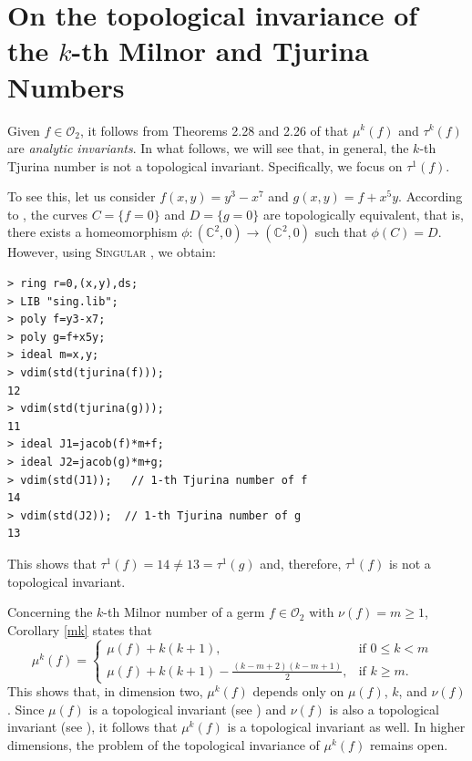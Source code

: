 \documentclass[12pt,letterpaper]{amsart}
\newcommand{\C}{\mathbb{C}}
\begin{document}
\section{On the topological invariance of the $k$-th Milnor and Tjurina Numbers}\label{topo}

Given $f\in\mathcal{O}_2$, it follows from Theorems 2.28 and 2.26 of \cite{Greuel} that $\mu^k(f)$ and $\tau^k(f)$ are \textit{analytic invariants}.  In what follows, we will see that, in general, the $k$-th Tjurina number is not a topological invariant. Specifically, we focus on $\tau^1(f)$.
\par To see this, let us consider $f(x,y)=y^3-x^7$ and $g(x,y)=f+x^5y$. According to \cite[p. 218]{Greuel}, the curves $C=\{f=0\}$ and $D=\{g=0\}$ are topologically equivalent, that is, there exists a homeomorphism $\phi:(\C^2,0)\to(\C^2,0)$ such that $\phi(C)=D$. However, using \textsc{Singular} \cite{Singular}, we obtain:
\begin{verbatim}
> ring r=0,(x,y),ds;      
> LIB "sing.lib";          
> poly f=y3-x7;               
> poly g=f+x5y;                 
> ideal m=x,y;                                     
> vdim(std(tjurina(f)));                         
12                                        
> vdim(std(tjurina(g)));                             
11                                            
> ideal J1=jacob(f)*m+f;               
> ideal J2=jacob(g)*m+g;                 
> vdim(std(J1));   // 1-th Tjurina number of f              
14                                          
> vdim(std(J2));  // 1-th Tjurina number of g               
13      
\end{verbatim}

This shows that $\tau^{1}(f)=14\neq 13=\tau^{1}(g)$ and, therefore, $\tau^{1}(f)$ is not a topological invariant.

\par Concerning the $k$-th Milnor number of a germ $f\in\mathcal{O}_2$ with $\nu(f)=m\geq 1$, Corollary \ref{mk} states that
\[
\mu^k(f)=\begin{cases}
			\mu(f)+k(k+1), & \text{if $0\leq k< m$ }\\[4pt]
            \mu(f)+k(k+1)-\frac{(k-m+2)(k-m+1)}{2}, & \text{if $k\geq m$.}
		 \end{cases}
\]
This shows that, in dimension two, $\mu^{k}(f)$ depends only on $\mu(f)$, $k$, and $\nu(f)$. Since $\mu(f)$ is a topological invariant (see \cite{Le}) and $\nu(f)$ is also a topological invariant (see \cite{Oscar}), it follows that $\mu^{k}(f)$ is a topological invariant as well.  In higher dimensions, the problem of the topological invariance of $\mu^{k}(f)$ remains open. 
\end{document}
